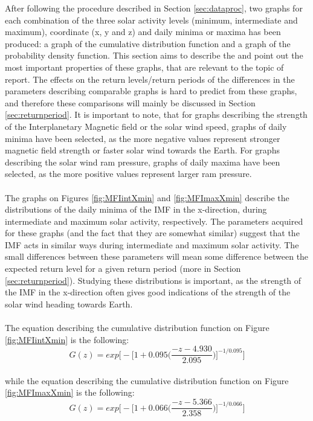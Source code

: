 \documentclass[12pt]{article}
\begin{document}
        After following the procedure described in Section \ref{sec:dataproc}, two graphs for each combination of the three solar activity levels (minimum, intermediate and maximum), coordinate (x, y and z) and daily minima or maxima has been produced: a graph of the cumulative distribution function and a graph of the probability density function. This section aims to describe the and point out the most important properties of these graphs, that are relevant to the topic of report. The effects on the return levels/return periods of the differences in the parameters describing comparable graphs is hard to predict from these graphs, and therefore these comparisons will mainly be discussed in Section \ref{sec:returnperiod}. It is important to note, that for graphs describing the strength of the Interplanetary Magnetic field or the solar wind speed, graphs of daily minima have been selected, as the more negative values represent stronger magnetic field strength or faster solar wind towards the Earth. For graphs describing the solar wind ram pressure, graphs of daily maxima have been selected, as the more positive values represent larger ram pressure.\\ \\
        The graphs on Figures \ref{fig:MFIintXmin} and \ref{fig:MFImaxXmin} describe the distributions of the daily minima of the IMF in the x-direction, during intermediate and maximum solar activity, respectively. The parameters acquired for these graphs (and the fact that they are somewhat similar) suggest that the IMF acts in similar ways during intermediate and maximum solar activity. The small differences between these parameters will mean some difference between the expected return level for a given return period (more in Section \ref{sec:returnperiod}). Studying these distributions is important, as the strength of the IMF in the x-direction often gives good indications of the strength of the solar wind heading towards Earth.\\ \\
        The equation describing the cumulative distribution function on Figure \ref{fig:MFIintXmin} is the following:
        \begin{equation}
            G(z) = exp\Bigg [-\Bigg [1+0.095 \Bigg (\frac{-z-4.930}{2.095}\Bigg )\Bigg ]^{-1/0.095}\Bigg ]
        \end{equation}\\
        while the equation describing the cumulative distribution function on Figure \ref{fig:MFImaxXmin} is the following:
        \begin{equation}
            G(z) = exp\Bigg [-\Bigg [1+0.066 \Bigg (\frac{-z-5.366}{2.358}\Bigg )\Bigg ]^{-1/0.066}\Bigg ]
        \end{equation}\\ \\
\end{document}
